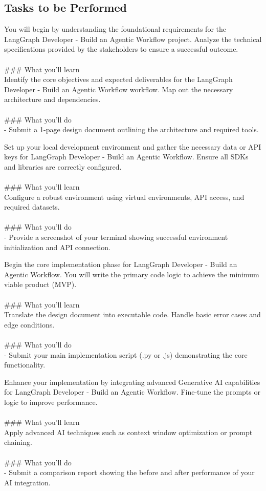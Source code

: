 \documentclass{article}
\begin{document}
\subsection*{Tasks to be Performed}
You will begin by understanding the foundational requirements for the LangGraph Developer - Build an Agentic Workflow project. Analyze the technical specifications provided by the stakeholders to ensure a successful outcome. \\
 \\
### What you'll learn \\
Identify the core objectives and expected deliverables for the LangGraph Developer - Build an Agentic Workflow workflow. Map out the necessary architecture and dependencies. \\
 \\
### What you'll do \\
- Submit a 1-page design document outlining the architecture and required tools.

Set up your local development environment and gather the necessary data or API keys for LangGraph Developer - Build an Agentic Workflow. Ensure all SDKs and libraries are correctly configured. \\
 \\
### What you'll learn \\
Configure a robust environment using virtual environments, API access, and required datasets. \\
 \\
### What you'll do \\
- Provide a screenshot of your terminal showing successful environment initialization and API connection.

Begin the core implementation phase for LangGraph Developer - Build an Agentic Workflow. You will write the primary code logic to achieve the minimum viable product (MVP). \\
 \\
### What you'll learn \\
Translate the design document into executable code. Handle basic error cases and edge conditions. \\
 \\
### What you'll do \\
- Submit your main implementation script (.py or .js) demonstrating the core functionality.

Enhance your implementation by integrating advanced Generative AI capabilities for LangGraph Developer - Build an Agentic Workflow. Fine-tune the prompts or logic to improve performance. \\
 \\
### What you'll learn \\
Apply advanced AI techniques such as context window optimization or prompt chaining. \\
 \\
### What you'll do \\
- Submit a comparison report showing the before and after performance of your AI integration.
\end{document}
